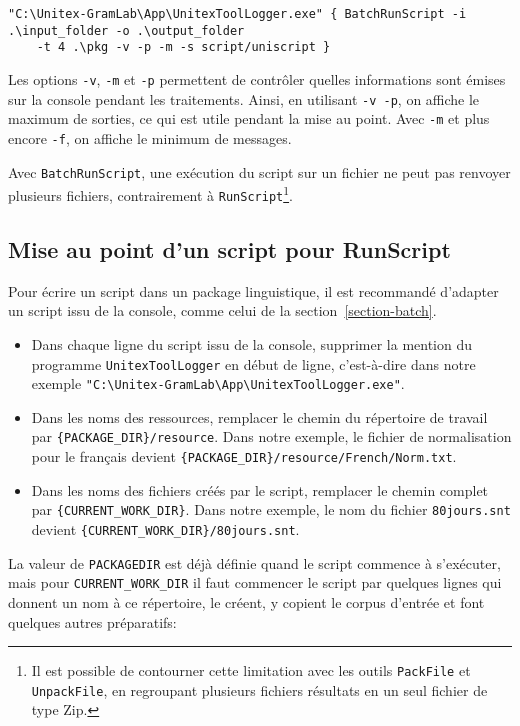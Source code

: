 \begin{Verbatim}[fontsize=\small,fontfamily=helvetica]
"C:\Unitex-GramLab\App\UnitexToolLogger.exe" { BatchRunScript -i .\input_folder -o .\output_folder 
    -t 4 .\pkg -v -p -m -s script/uniscript }
\end{Verbatim}

\noindent Les options \verb$-v$, \verb$-m$ et \verb$-p$ permettent de contrôler quelles 
informations sont émises sur la console pendant les traitements. Ainsi, en utilisant \verb$-v -p$,
on affiche le maximum de sorties, ce qui est utile pendant la mise au point. Avec \verb$-m$
et plus encore \verb$-f$, on affiche le minimum de messages.

\bigskip
\noindent Avec \verb$BatchRunScript$, une exécution du script sur un fichier ne peut pas
renvoyer plusieurs fichiers, contrairement à \verb$RunScript$\footnote{Il est possible de
contourner cette limitation avec les outils \texttt{PackFile}  et \texttt{UnpackFile}, en
regroupant plusieurs fichiers résultats en un seul fichier de type Zip.}.



\subsection{Mise au point d'un script pour RunScript}
\label{section-script-for-runscript}
Pour écrire un script dans un package linguistique, il est recommandé d'adapter un script issu
de la console, comme celui de la section~\ref{section-batch}.

\begin{itemize}     
\item Dans chaque ligne du script issu de la console, supprimer la mention du programme
\verb$UnitexToolLogger$ en début de ligne, c'est-à-dire dans notre exemple
\verb$"C:\Unitex-GramLab\App\UnitexToolLogger.exe"$.
\item Dans les noms des ressources, remplacer le chemin du répertoire de travail par
\verb${PACKAGE_DIR}/resource$. Dans notre exemple, le fichier de normalisation pour le français
devient \verb${PACKAGE_DIR}/resource/French/Norm.txt$.
\item Dans les noms des fichiers créés par le script, remplacer le chemin complet par
\verb${CURRENT_WORK_DIR}$. Dans notre exemple, le nom du fichier \verb$80jours.snt$ devient
\verb${CURRENT_WORK_DIR}/80jours.snt$.
\end{itemize}

\noindent La valeur de \verb$PACKAGEDIR$ est déjà définie quand le script commence à s'exécuter,
mais pour \verb$CURRENT_WORK_DIR$ il faut commencer le script par quelques lignes qui donnent un
nom à ce répertoire, le créent, y copient le corpus d'entrée et font quelques autres préparatifs:

